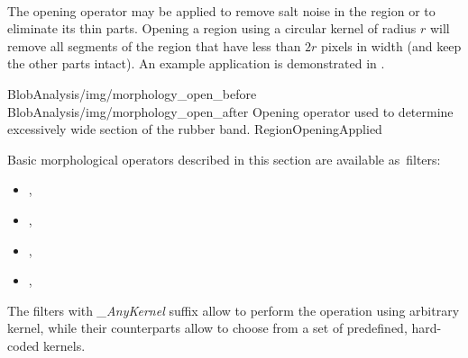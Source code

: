 \paragraph*{}
The opening operator may be applied to remove salt noise in the region or to eliminate its thin parts. Opening a region using a circular kernel of radius $r$ will remove all segments of the region that have less than $2r$ pixels in width (and keep the other parts intact). An example application is demonstrated in .

\twoFigures
{BlobAnalysis/img/morphology_open_before}
{BlobAnalysis/img/morphology_open_after}
{Opening operator used to determine excessively wide section of the rubber band.}
{RegionOpeningApplied}
{\basicWidth}

\begin{refImpl}
Basic morphological operators described in this section are available as \studio \,filters:
\begin{itemize}
    \item {}, 
    \item {}, 
    \item {}, 
    \item {}, 
\end{itemize}
The filters with \textit{\_AnyKernel} suffix allow to perform the operation using arbitrary kernel, while their counterparts allow to choose from a set of predefined, hard-coded kernels.
\end{refImpl}